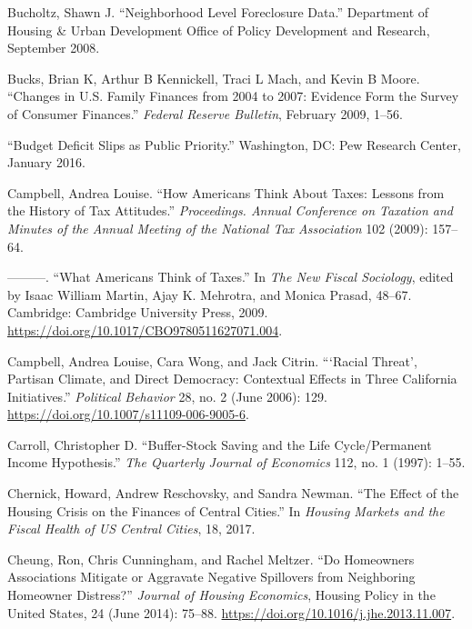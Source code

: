 \documentclass[12pt,oneside]{psthesis}
\begin{document}
\leavevmode\hypertarget{ref-bucholtz2008neighborhood}{}%
Bucholtz, Shawn J. ``Neighborhood Level Foreclosure Data.'' Department of Housing \& Urban Development Office of Policy Development and Research, September 2008.

\leavevmode\hypertarget{ref-bucks2009changes}{}%
Bucks, Brian K, Arthur B Kennickell, Traci L Mach, and Kevin B Moore. ``Changes in U.S. Family Finances from 2004 to 2007: Evidence Form the Survey of Consumer Finances.'' \emph{Federal Reserve Bulletin}, February 2009, 1--56.

\leavevmode\hypertarget{ref-2016budget}{}%
``Budget Deficit Slips as Public Priority.'' Washington, DC: Pew Research Center, January 2016.

\leavevmode\hypertarget{ref-campbell2009how}{}%
Campbell, Andrea Louise. ``How Americans Think About Taxes: Lessons from the History of Tax Attitudes.'' \emph{Proceedings. Annual Conference on Taxation and Minutes of the Annual Meeting of the National Tax Association} 102 (2009): 157--64.

\leavevmode\hypertarget{ref-campbell2009what}{}%
---------. ``What Americans Think of Taxes.'' In \emph{The New Fiscal Sociology}, edited by Isaac William Martin, Ajay K. Mehrotra, and Monica Prasad, 48--67. Cambridge: Cambridge University Press, 2009. \url{https://doi.org/10.1017/CBO9780511627071.004}.

\leavevmode\hypertarget{ref-campbell2006racial}{}%
Campbell, Andrea Louise, Cara Wong, and Jack Citrin. ```Racial Threat', Partisan Climate, and Direct Democracy: Contextual Effects in Three California Initiatives.'' \emph{Political Behavior} 28, no. 2 (June 2006): 129. \url{https://doi.org/10.1007/s11109-006-9005-6}.

\leavevmode\hypertarget{ref-carroll1997bufferstock}{}%
Carroll, Christopher D. ``Buffer-Stock Saving and the Life Cycle/Permanent Income Hypothesis.'' \emph{The Quarterly Journal of Economics} 112, no. 1 (1997): 1--55.

\leavevmode\hypertarget{ref-chernick2017effect}{}%
Chernick, Howard, Andrew Reschovsky, and Sandra Newman. ``The Effect of the Housing Crisis on the Finances of Central Cities.'' In \emph{Housing Markets and the Fiscal Health of US Central Cities}, 18, 2017.

\leavevmode\hypertarget{ref-cheung2014homeowners}{}%
Cheung, Ron, Chris Cunningham, and Rachel Meltzer. ``Do Homeowners Associations Mitigate or Aggravate Negative Spillovers from Neighboring Homeowner Distress?'' \emph{Journal of Housing Economics}, Housing Policy in the United States, 24 (June 2014): 75--88. \url{https://doi.org/10.1016/j.jhe.2013.11.007}.
\end{document}
